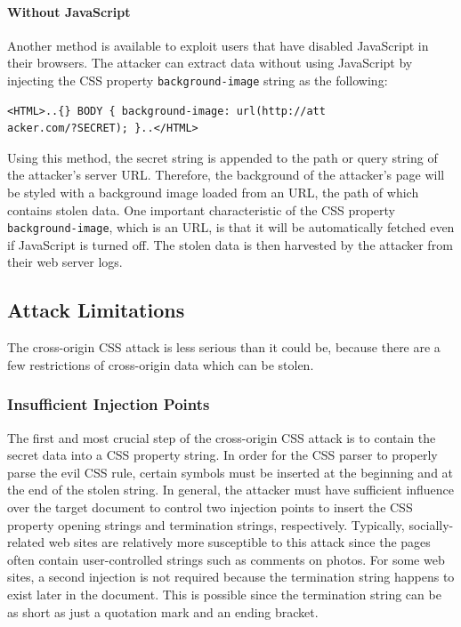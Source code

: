 \documentclass{acm_proc_article-sp}
\begin{document}
\paragraph{Without JavaScript}
Another method is available to exploit users that have disabled JavaScript in their browsers. The attacker can extract data without using JavaScript by injecting the CSS property \texttt{background-image} string as the following:
\begin{verbatim}
<HTML>..{} BODY { background-image: url(http://att
acker.com/?SECRET); }..</HTML>
\end{verbatim}
Using this method, the secret string is appended to the path or query string of the attacker's server URL. Therefore, the background of the attacker's page will be styled with a background image loaded from an URL, the path of which contains stolen data. One important characteristic of the CSS property \texttt{background-image}, which is an URL, is that it will be automatically fetched even if JavaScript is turned off. The stolen data is then harvested by the attacker from their web server logs.

\subsection{Attack Limitations}
The cross-origin CSS attack is less serious than it could be, because there are a few restrictions of cross-origin data which can be stolen.

\subsubsection{Insufficient Injection Points}
The first and most crucial step of the cross-origin CSS attack is to contain the secret data into a CSS property string. In order for the CSS parser to properly parse the evil CSS rule, certain symbols must be inserted at the beginning and at the end of the stolen string. In general, the attacker must have sufficient influence over the target document to control two injection points to insert the CSS property opening strings and termination strings, respectively. Typically, socially-related web sites are relatively more susceptible to this attack since the pages often contain user-controlled strings such as comments on photos. For some web sites, a second injection is not required because the termination string happens to exist later in the document. This is possible since the termination string can be as short as just a quotation mark and an ending bracket. 
\end{document}
